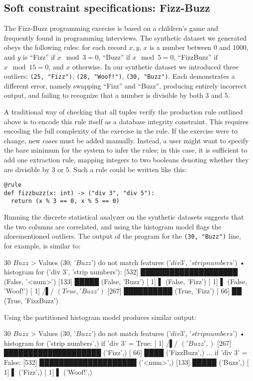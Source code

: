 \subsection{Soft constraint specifications: Fizz-Buzz}
The Fizz-Buzz programming exercise is based on a children's game and frequently found in programming interviews. The synthetic dataset we generated obeys the following rules: for each record \(x, y\), $x$ is a number between 0 and 1000, and $y$ is ``Fizz'' if \(x \mod 3 = 0\), ``Buzz'' if \(x \mod 5 = 0\), ``FizzBuzz'' if \(x \mod 15 = 0\), and \(x\) otherwise. In our synthetic dataset we introduced three outliers: \texttt{(25, "Fizz")}, \texttt{(28, "Woof!")}, \texttt{(30, "Buzz")}. Each demonstrates a different error, namely swapping ``Fizz'' and ``Buzz'', producing entirely incorrect output, and failing to recognize that a number is divisible by both $3$ and $5$.

A traditional way of checking that all tuples verify the production rule outlined above is to encode this rule itself as a database integrity constraint. This requires encoding the full complexity of the exercise in the rule. If the exercise were to change, new cases must be added manually. Instead, a user might want to specify the bare minimum for the system to infer the rules; in this case, it is sufficient to add one extraction rule, mapping integers to two booleans denoting whether they are divisible by $3$ or $5$. Such a rule could be written like this:

\begin{verbatim}
@rule
def fizzbuzz(x: int) -> ("div 3", "div 5"):
  return (x % 3 == 0, x % 5 == 0)
\end{verbatim}

Running the discrete statistical analyzer on the synthetic datasets suggests that the two columns are correlated, and using the histogram model flags the aforementioned outliers. The output of the program for the \texttt{(30, "Buzz")} line, for example, is similar to:

\begin{lstnobreak}[gobble=2]
   $30$ $Buzz$
   > Values ($30$, '$Buzz$') do not
     match features ('$div 3$', '$strip numbers$')
   • histogram for ('div 3', 'strip numbers'):
     [532] ████████████████████ (False, '<num>')
     [133] █████ (False, 'Buzz')
     [  1] ▌ (False, 'Fizz')
     [  1] ▌ (False, 'Woof!')
     [  1] /▌/ $(True, 'Buzz')$
     [267] ██████████ (True, 'Fizz')
     [ 66] ██ (True, 'FizzBuzz')
\end{lstnobreak}

Using the partitioned histogram model produces similar output:

\begin{lstnobreak}[gobble=2]
   $30$ $Buzz$
   > Values ($30$, '$Buzz$') do not
     match features ('$div 3$', '$strip numbers$')
   • histogram for ('strip numbers',) if 'div 3' = True:
     [  1] /▌/ $('Buzz',)$
     [267] ████████████████████ ('Fizz',)
     [ 66] ████ ('FizzBuzz',)
   ... if 'div 3' = False:
     [532] ████████████████████ ('<num>',)
     [133] █████ ('Buzz',)
     [  1] ▌ ('Fizz',)
     [  1] ▌ ('Woof!',)
\end{lstnobreak}
